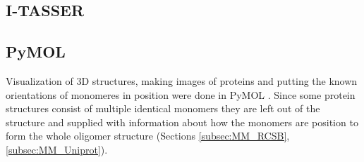 \subsection{I-TASSER}
\label{subsec:MM_I_TASSER}

\subsection{PyMOL}
Visualization of 3D structures, making images of proteins and putting the known orientations of monomeres in position  were done in PyMOL \cite{}.
Since some protein structures consist of multiple identical monomers they are left out of the structure and supplied with information about how the monomers are position to form the whole oligomer structure (Sections \ref{subsec:MM_RCSB}, \ref{subsec:MM_Uniprot}).

